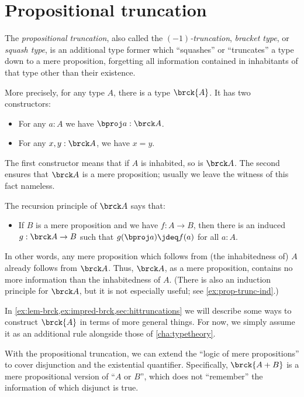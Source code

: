 \section{Propositional truncation}
\label{subsec:prop-trunc}

%
%
%
%
%
The \emph{propositional truncation}, also called the \emph{$(-1)$-truncation}, \emph{bracket type}, or \emph{squash type}, is an additional type former which ``squashes'' or ``truncates'' a type down to a mere proposition, forgetting all information contained in inhabitants of that type other than their existence.

More precisely, for any type $A$, there is a type $\brck{A}$.
It has two constructors:
\begin{itemize}
\item For any $a:A$ we have $\bproj a : \brck A$.
\item For any $x,y:\brck A$, we have $x=y$.
\end{itemize}
The first constructor means that if $A$ is inhabited, so is $\brck A$.
The second ensures that $\brck A$ is a mere proposition; usually we leave the witness of this fact nameless.

%
The recursion principle of $\brck A$ says that:
\begin{itemize}
\item If $B$ is a mere proposition and we have $f:A\to B$, then there is an induced $g:\brck A \to B$ such that $g(\bproj a) \jdeq f(a)$ for all $a:A$.
\end{itemize}
In other words, any mere proposition which follows from (the inhabitedness of) $A$ already follows from $\brck A$.
Thus, $\brck A$, as a mere proposition, contains no more information than the inhabitedness of $A$.
(There is also an induction principle for $\brck A$, but it is not especially useful; see \cref{ex:prop-trunc-ind}.)

In \cref{ex:lem-brck,ex:impred-brck,sec:hittruncations} we will describe some ways to construct $\brck{A}$ in terms of more general things.
For now, we simply assume it as an additional rule alongside those of \cref{cha:typetheory}.

With the propositional truncation, we can extend the ``logic of mere propositions'' to cover disjunction and the existential quantifier.
Specifically, $\brck{A+B}$ is a mere propositional version of ``$A$ or $B$'', which does not ``remember'' the information of which disjunct is true.


